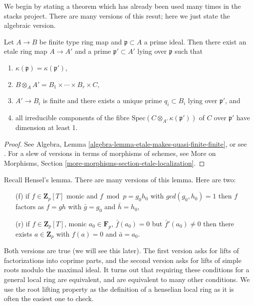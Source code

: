 \noindent
We begin by stating a theorem which has already been used many times
in the stacks project. There are many versions of this resut; here we
just state the algebraic version.

\begin{theorem}
\label{theorem-quasi-finite-etale-locally}
Let $A\to B$ be finite type ring map and $\mathfrak p \subset A$ a prime
ideal. Then there exist an etale ring map $A \to A'$ and a prime
$\mathfrak p' \subset A'$ lying over $\mathfrak p$ such that
\begin{enumerate}
\item
$\kappa(\mathfrak p) = \kappa(\mathfrak p')$,
\item
$ B \otimes_A A' = B_1\times \cdots \times B_r \times C$,
\item
$ A'\to B_i$ is finite and there exists a unique prime $q_i\subset B_i$ lying
over $\mathfrak p'$, and
\item all irreducible components of the fibre
$\text{Spec}(C\otimes_{A'} \kappa(\mathfrak p'))$ of $C$ over $\mathfrak p'$
have dimension at least 1.
\end{enumerate}
\end{theorem}

\begin{proof}
See Algebra, Lemma \ref{algebra-lemma-etale-makes-quasi-finite-finite}, or
see \cite[Th\'eor\`eme 18.12.1]{EGA4}. For a slew of versions in terms of
morphisms of schemes, see
More on Morphisms, Section \ref{more-morphisms-section-etale-localization}.
\end{proof}

\noindent
Recall Hensel's lemma.
There are many versions of this lemma. Here are two:
\begin{enumerate}
\item[(f)] if $f\in \mathbf{Z}_p[T]$ monic and
$f \bmod p = g_0 h_0$ with $gcd(g_0, h_0) = 1$ then $f$ factors
as $f = gh$ with $\bar g = g_0$ and $\bar h = h_0$,
\item[(r)] if $f \in \mathbf{Z}_p[T]$, monic $a_0 \in \mathbf{F}_p$,
$\bar f(a_0) =0$ but $\bar f'(a_0) \neq 0$
then there exists $a \in \mathbf{Z}_p$ with
$f(a) = 0$ and $\bar a = a_0$.
\end{enumerate}
Both versions are true (we will see this later). The first version
asks for lifts of factorizations into coprime parts,
and the second version asks for lifts of simple roots
modulo the maximal ideal. It turns out that requiring
these conditions for a general local ring are equivalent, and are
equivalent to many other conditions. We use the root lifting
property as the definition of a henselian local ring as it is
often the easiest one to check.

